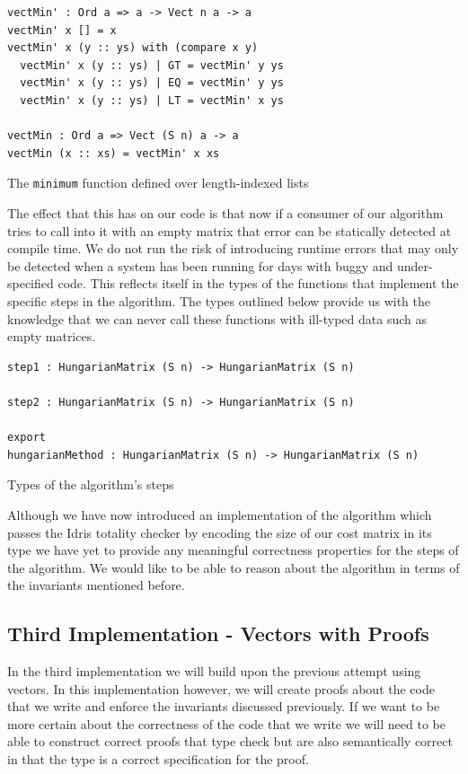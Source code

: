 \documentclass[a4paper, notitlepage]{report}
\begin{document}
\begin{listing}[H]
\begin{verbatim}
vectMin' : Ord a => a -> Vect n a -> a
vectMin' x [] = x
vectMin' x (y :: ys) with (compare x y)
  vectMin' x (y :: ys) | GT = vectMin' y ys
  vectMin' x (y :: ys) | EQ = vectMin' y ys
  vectMin' x (y :: ys) | LT = vectMin' x ys

vectMin : Ord a => Vect (S n) a -> a
vectMin (x :: xs) = vectMin' x xs
\end{verbatim}
\caption{The \texttt{minimum} function defined over length-indexed lists}
\end{listing}

The effect that this has on our code is that now if a consumer of our algorithm
tries to call into it with an empty matrix that error can be statically detected
at compile time. We do not run the risk of introducing runtime errors that may
only be detected when a system has been running for days with buggy and
under-specified code. This reflects itself in the types of the functions that
implement the specific steps in the algorithm. The types outlined below provide
us with the knowledge that we can never call these functions with ill-typed data
such as empty matrices.

\begin{listing}[H]
\begin{verbatim}
step1 : HungarianMatrix (S n) -> HungarianMatrix (S n)

step2 : HungarianMatrix (S n) -> HungarianMatrix (S n)

export
hungarianMethod : HungarianMatrix (S n) -> HungarianMatrix (S n)
\end{verbatim}
\caption{Types of the algorithm's steps}
\end{listing}

Although we have now introduced an implementation of the algorithm which passes
the Idris totality checker by encoding the size of our cost matrix in its type
we have yet to provide any meaningful correctness properties for the steps of
the algorithm. We would like to be able to reason about the algorithm in terms
of the invariants mentioned before.

\subsection{Third Implementation - Vectors with Proofs}
\label{sec:orgda3be7e}
In the third implementation we will build upon the previous attempt using
vectors. In this implementation however, we will create proofs about the code
that we write and enforce the invariants discussed previously. If we want to be
more certain about the correctness of the code that we write we will need to be
able to construct correct proofs that type check but are also semantically
correct in that the type is a correct specification for the proof.
\end{document}
